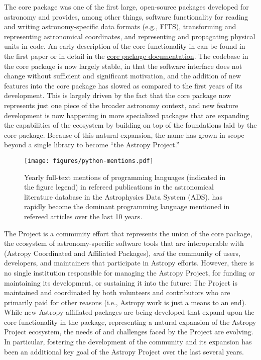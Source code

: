 \documentclass[modern]{aastex631}
\begin{document}
The \astropypkg core package was one of the first large, open-source \python
packages developed for astronomy and provides, among other things, software
functionality for reading and writing astronomy-specific data formats (e.g.,
FITS), transforming and representing astronomical coordinates, and representing
and propagating physical units in code.
An early description of the core functionality in \astropypkg can be found in
the first \astropy paper \citep{astropy:2013} or in detail in the
\href{https://docs.astropy.org/}{core package documentation}.
The codebase in the \astropypkg core package is now largely stable, in that the
software interface does not change without sufficient and significant
motivation, and the addition of new features into the core package has slowed
as compared to the first years of its development.
This is largely driven by the fact that the core package now represents just one
piece of the broader astronomy \python context, and new feature development
is now happening in more specialized packages that are expanding the
capabilities of the \astropy ecosystem by building on top of the foundations
laid by the \astropypkg core package.
Because of this natural expansion, the name \astropy has grown in scope beyond a
single \python library to become ``the Astropy Project.''

\begin{figure}[t!]
    \begin{centering}
      \texttt{[image: figures/python-mentions.pdf]}
        \caption{
            Yearly full-text mentions of programming languages (indicated in the
            figure legend) in refereed publications in the astronomical
            literature database in the Astrophysics Data System (ADS).
            \python has rapidly become the dominant programming language
            mentioned in refereed articles over the last 10 years.
        }
        \label{fig:python-mentions}
    \end{centering}
\end{figure}

The \astropy Project is a community effort that represents the union of the
\astropypkg core package, the ecosystem of astronomy-specific software tools
that are interoperable with \astropypkg (Astropy Coordinated and Affiliated Packages),
\emph{and} the community of users, developers, and maintainers that participate
in Astropy efforts.
However, there is no single institution responsible for managing the Astropy Project,
for funding or maintaining its development, or sustaining it into the future:
The Project is maintained and coordinated by both volunteers and contributors
who are primarily paid for other reasons (i.e., Astropy work is just a means to an end).
While new Astropy-affiliated packages are being developed that expand upon the
core functionality in the \astropypkg package, representing a natural expansion
of the Astropy Project ecosystem, the needs of and challenges faced by the
Project are evolving.
In particular, fostering the development of the community and its expansion has
been an additional key goal of the Astropy Project over the last several years.
\end{document}
